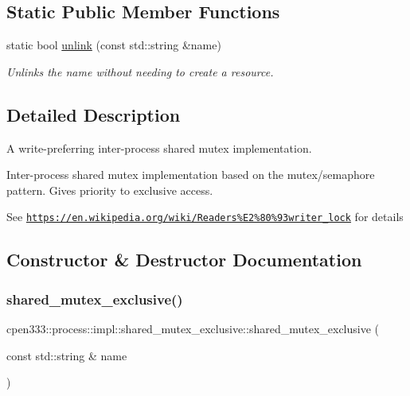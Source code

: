\subsection*{Static Public Member Functions}
\begin{DoxyCompactItemize}
\item 
static bool \hyperlink{classcpen333_1_1process_1_1impl_1_1shared__mutex__exclusive_a5d16bc8d626096e38d6ca13b23de572e}{unlink} (const std\+::string \&name)
\begin{DoxyCompactList}\small\item\em Unlinks the name without needing to create a resource. \end{DoxyCompactList}\end{DoxyCompactItemize}


\subsection{Detailed Description}
A write-\/preferring inter-\/process shared mutex implementation. 

Inter-\/process shared mutex implementation based on the mutex/semaphore pattern. Gives priority to exclusive access.

See \href{https://en.wikipedia.org/wiki/Readers%E2%80%93writer_lock}{\tt https\+://en.\+wikipedia.\+org/wiki/\+Readers\%\+E2\%80\%93writer\+\_\+lock} for details 

\subsection{Constructor \& Destructor Documentation}
\mbox{\label{classcpen333_1_1process_1_1impl_1_1shared__mutex__exclusive_a3acb5fa0c2f3f12200d194d53f7dfad4}} 
\subsubsection{\texorpdfstring{shared\+\_\+mutex\+\_\+exclusive()}{shared\_mutex\_exclusive()}}
{\footnotesize\ttfamily cpen333\+::process\+::impl\+::shared\+\_\+mutex\+\_\+exclusive\+::shared\+\_\+mutex\+\_\+exclusive (\begin{DoxyParamCaption}\item[{const std\+::string \&}]{name }\end{DoxyParamCaption})\hspace{0.3cm}{\ttfamily [inline]}}

